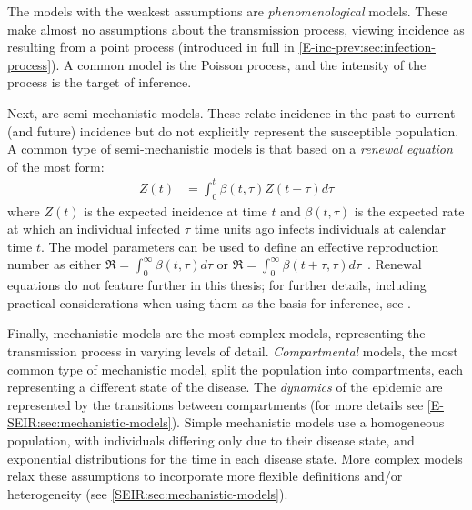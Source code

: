 \documentclass[thesis.tex]{subfiles}
\begin{document}
The models with the weakest assumptions are \emph{phenomenological} models.
These make almost no assumptions about the transmission process, viewing incidence as resulting from a point process (introduced in full in \cref{E-inc-prev:sec:infection-process}).
A common model is the Poisson process, and the intensity of the process is the target of inference.

Next, are semi-mechanistic models.
These relate incidence in the past to current (and future) incidence but do not explicitly represent the susceptible population.
A common type of semi-mechanistic models is that based on a \emph{renewal equation}~\autocite{bhattSemimechanistic,fraserRenewal} of the most form:
\begin{align}
    Z(t) &= \int_{0}^{t} \beta(t,\tau) Z(t-\tau) d \tau
    \label{intro:eq:renewal}
\end{align}
where $Z(t)$ is the expected incidence at time $t$ and $\beta(t, \tau)$ is the expected rate at which an individual infected $\tau$ time units ago infects individuals at calendar time $t$.
The model parameters can be used to define an effective reproduction number as either $\Re = \int_0^\infty \beta(t, \tau) d\tau$ or $\Re = \int_0^\infty \beta(t+\tau, \tau) d\tau$~\autocite{gosticPractical}.
Renewal equations do not feature further in this thesis; for further details, including practical considerations when using them as the basis for inference, see \textcite{thompsonImproved,gosticPractical}.

Finally, mechanistic models are the most complex models, representing the transmission process in varying levels of detail.
\emph{Compartmental} models, the most common type of mechanistic model, split the population into compartments, each representing a different state of the disease.
The \emph{dynamics} of the epidemic are represented by the transitions between compartments (for more details see \cref{E-SEIR:sec:mechanistic-models}).
Simple mechanistic models use a homogeneous population, with individuals differing only due to their disease state, and exponential distributions for the time in each disease state.
More complex models relax these assumptions to incorporate more flexible definitions and/or heterogeneity (see \cref{SEIR:sec:mechanistic-models}).
\end{document}

